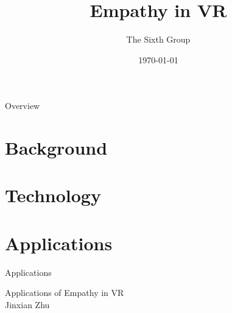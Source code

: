 \documentclass[aspectratio=169,xcolor=dvipsnames]{beamer}
\title{Empathy in VR}
\author{The Sixth Group}
\date{\today} %
\begin{document}
\begin{frame}
    \titlepage
\end{frame}

\begin{frame}{Overview}
    \tableofcontents
\end{frame}

\section{Background}

\section{Technology}

\section{Applications}
\begin{frame}{Applications}
    \begin{center}
        \Large{Applications of Empathy in VR}\\
        \vspace{0.5cm}
        \normalsize{Jinxian Zhu}
    \end{center}
\end{frame}
\end{document}

